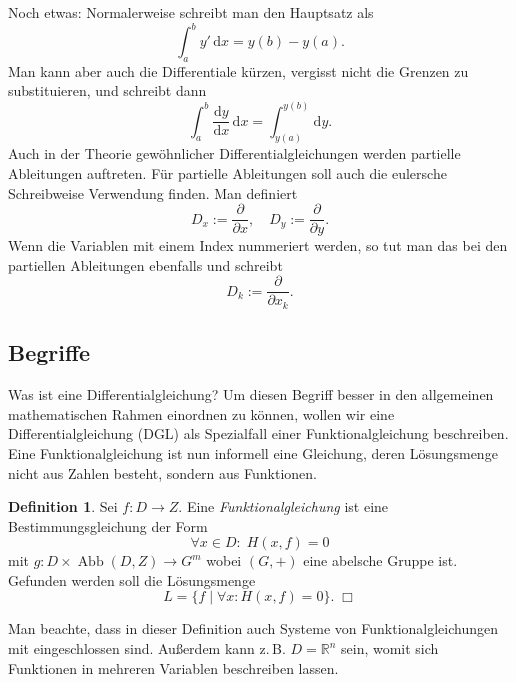 \documentclass[a4paper,10pt,fleqn,twocolumn,twoside,openany]{article}
\numberwithin{equation}{section}
\newcommand{\R}{\mathbb R}
\theoremstyle{definition}
\newtheorem{Definition}{Definition}
\begin{document}
Noch etwas: Normalerweise schreibt man den Hauptsatz als
\begin{equation}
\int_a^b y'\,\mathrm dx = y(b)-y(a).
\end{equation}
Man kann aber auch die Differentiale {\glqq}kürzen{\grqq},
vergisst nicht die Grenzen zu substituieren, und schreibt dann
\begin{equation}
\int_a^b \frac{\mathrm dy}{\mathrm dx}\,\mathrm dx
= \int_{y(a)}^{y(b)}\mathrm dy.
\end{equation}
Auch in der Theorie gewöhnlicher Differentialgleichungen werden
partielle Ableitungen auftreten. Für partielle Ableitungen soll
auch die eulersche Schreibweise Verwendung finden. Man definiert
\begin{equation}
D_x := \frac{\partial}{\partial x},\quad
D_y := \frac{\partial}{\partial y}.
\end{equation}
Wenn die Variablen mit einem Index nummeriert werden, so
tut man das bei den partiellen Ableitungen ebenfalls und schreibt
\begin{equation}
D_k := \frac{\partial}{\partial x_k}.
\end{equation}

\subsection{Begriffe}
Was ist eine Differentialgleichung? Um diesen Begriff besser in den
allgemeinen mathematischen Rahmen einordnen zu können, wollen wir eine
Differentialgleichung (DGL) als Spezialfall einer Funktionalgleichung
beschreiben. Eine Funktionalgleichung ist nun informell eine Gleichung,
deren Lösungsmenge nicht aus Zahlen besteht, sondern aus Funktionen.

\begin{Definition}
Sei $f\colon D\to Z$. Eine \emph{Funktionalgleichung} ist
eine Bestimmungsgleichung der Form
\begin{equation}\label{eq:Funktionalgleichung}
\forall x{\in}D\colon\;H(x,f)=0
\end{equation}
mit $g\colon D\times\operatorname{Abb}(D,Z)\to G^m$ wobei $(G,+)$
eine abelsche Gruppe ist. Gefunden werden soll die
Lösungsmenge%
\begin{equation}
L = \{f\mid\forall x\colon H(x,f)=0\}.\;\Box
\end{equation}
\end{Definition}
\noindent
Man beachte, dass in dieser Definition auch Systeme
von Funktionalgleichungen
mit eingeschlossen sind. Außerdem kann z.\,B. $D=\R^n$ sein, womit
sich Funktionen in mehreren Variablen beschreiben lassen.
\end{document}

